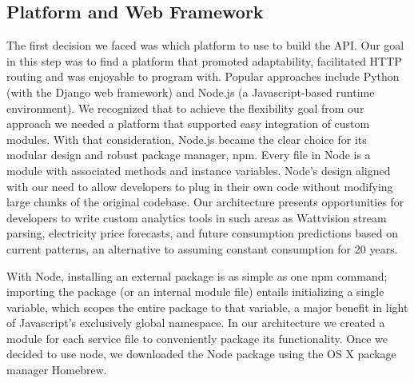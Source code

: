 \documentclass[pageno]{jpaper}
\begin{document}
\subsection{Platform and Web Framework}
The first decision we faced was which platform to use to build the API. Our goal in this step was to find a platform that promoted adaptability, facilitated HTTP routing and was enjoyable to program with. Popular approaches include Python (with the Django web framework) and Node.js (a Javascript-based runtime environment). We recognized that to achieve the flexibility goal from our approach we needed a platform that supported easy integration of custom modules. With that consideration, Node.js became the clear choice for its modular design and robust package manager, npm. Every file in Node is a module with associated methods and instance variables. Node's design aligned with our need to allow developers to plug in their own code without modifying large chunks of the original codebase. Our architecture presents opportunities for developers to write custom analytics tools in such areas as Wattvision stream parsing, electricity price forecasts, and future consumption predictions based on current patterns, an alternative to assuming constant consumption for 20 years.

With Node, installing an external package is as simple as one npm command; importing the package (or an internal module file) entails initializing a single variable, which scopes the entire package to that variable, a major benefit in light of Javascript's exclusively global namespace. In our architecture we created a module for each service file to conveniently package its functionality. Once we decided to use node, we downloaded the Node package using the OS X package manager Homebrew.
\end{document}
